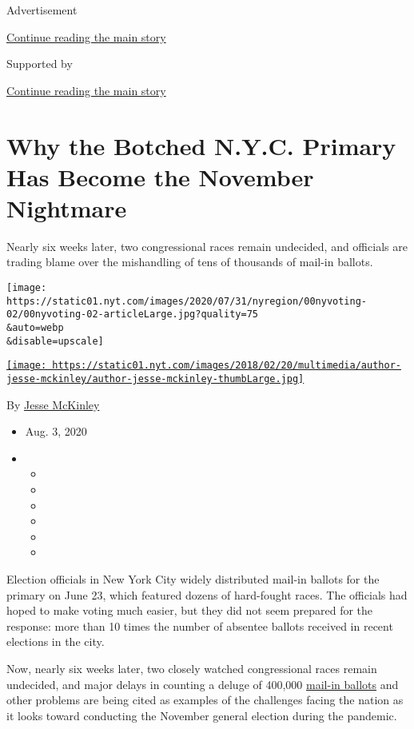 Advertisement

\protect\hyperlink{after-top}{Continue reading the main story}

Supported by

\protect\hyperlink{after-sponsor}{Continue reading the main story}

\hypertarget{why-the-botched-nyc-primary-has-become-the-november-nightmare}{%
\section{Why the Botched N.Y.C. Primary Has Become the November
Nightmare}\label{why-the-botched-nyc-primary-has-become-the-november-nightmare}}

Nearly six weeks later, two congressional races remain undecided, and
officials are trading blame over the mishandling of tens of thousands of
mail-in ballots.

\texttt{[image: https://static01.nyt.com/images/2020/07/31/nyregion/00nyvoting-02/00nyvoting-02-articleLarge.jpg?quality=75\\\&auto=webp\\\&disable=upscale]}

\href{https://www.nytimes.com/by/jesse-mckinley}{\texttt{[image: https://static01.nyt.com/images/2018/02/20/multimedia/author-jesse-mckinley/author-jesse-mckinley-thumbLarge.jpg]}}

By \href{https://www.nytimes.com/by/jesse-mckinley}{Jesse McKinley}

\begin{itemize}
\item
  Aug. 3, 2020
\item
  \begin{itemize}
  \item
  \item
  \item
  \item
  \item
  \item
  \end{itemize}
\end{itemize}

Election officials in New York City widely distributed mail-in ballots
for the primary on June 23, which featured dozens of hard-fought races.
The officials had hoped to make voting much easier, but they did not
seem prepared for the response: more than 10 times the number of
absentee ballots received in recent elections in the city.

Now, nearly six weeks later, two closely watched congressional races
remain undecided, and major delays in counting a deluge of 400,000
\href{https://www.nytimes.com/2020/08/03/us/politics/trump-mail-in-voting.html}{mail-in
ballots} and other problems are being cited as examples of the
challenges facing the nation as it looks toward conducting the November
general election during the pandemic.

